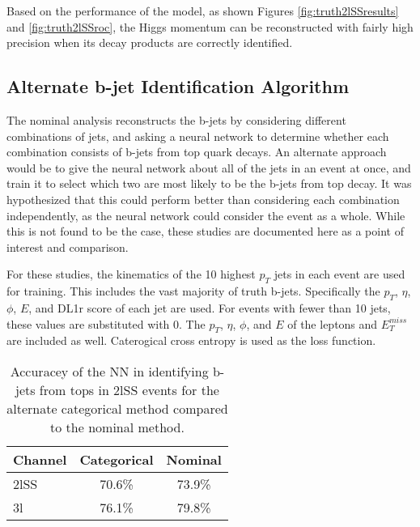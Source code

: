 Based on the performance of the model, as shown Figures \ref{fig:truth2lSSresults} and \ref{fig:truth2lSSroc}, the Higgs momentum can be reconstructed with fairly high precision when its decay products are correctly identified.

\subsection{Alternate b-jet Identification Algorithm}
\label{subsec:topRecoApx}

The nominal analysis reconstructs the b-jets by considering different combinations of jets, and asking a neural network to determine whether each combination consists of b-jets from top quark decays. An alternate approach would be to give the neural network about all of the jets in an event at once, and train it to select which two are most likely to be the b-jets from top decay. It was hypothesized that this could perform better than considering each combination independently, as the neural network could consider the event as a whole. While this is not found to be the case, these studies are documented here as a point of interest and comparison.

For these studies, the kinematics of the 10 highest $p_T$ jets in each event are used for training. This includes the vast majority of truth b-jets. Specifically the $p_T$, $\eta$, $\phi$, $E$, and DL1r score of each jet are used. For events with fewer than 10 jets, these values are substituted with 0. The $p_T$, $\eta$, $\phi$, and $E$ of the leptons and $E_T^{miss}$ are included as well. Caterogical cross entropy is used as the loss function.

\begin{table}[H]
  \centering
  \caption{Accuracey of the NN in identifying b-jets from tops in 2lSS events for the alternate categorical method compared to the nominal method.}
  \begin{tabular}{l|c|c}                                                                                                     
  \hline\hline
  Channel & Categorical & Nominal \\                                                                              
  \hline                                                                                                                  
  2lSS & 70.6\% & 73.9\% \\
  3l & 76.1\% & 79.8\% \\
  \hline                                                                                                                 
  \end{tabular}                                                                                                           
  \label{tab:topMatchCatApx}
\end{table}

